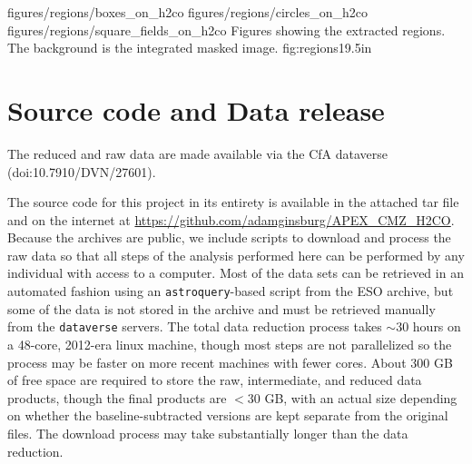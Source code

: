 \RotFigureThreeAA
{figures/regions/boxes_on_h2co}
{figures/regions/circles_on_h2co}
{figures/regions/square_fields_on_h2co}
{Figures showing the extracted regions.  The background is the integrated
masked \para \threeohthree image.}
{fig:regions}{1}{9.5in}

\section{Source code and Data release}
The reduced and raw data are made available via the CfA dataverse
(doi:10.7910/DVN/27601).

The source code for this project in its entirety is available in the attached
tar file and on the internet at
\url{https://github.com/adamginsburg/APEX_CMZ_H2CO}.
Because the archives are public, we include scripts to download and process the
raw data so that all steps of the analysis performed here can be performed by
any individual with access to a computer.  Most of the data sets can be retrieved
in an automated fashion using an \texttt{astroquery}-based script from the ESO archive,
but some of the data is not stored in the archive and must be retrieved manually from the
\texttt{dataverse} servers. The total data reduction process
takes $\sim30$ hours on a 48-core, 2012-era linux machine, though most steps
are not parallelized so the process may be faster on more recent machines with
fewer cores.  About 300 GB of free space are required to store the raw,
intermediate, and reduced data products, though the final products are $<30$
GB, with an actual size depending on whether the baseline-subtracted versions
are kept separate from the original files.  The download process may take
substantially longer than the data reduction.






